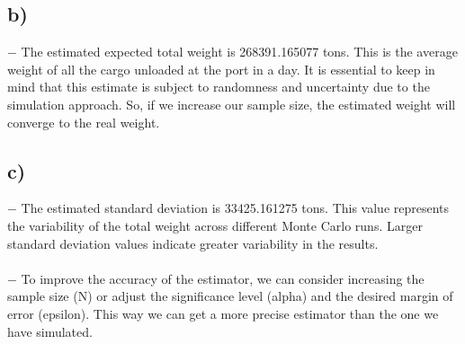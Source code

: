 \documentclass[12pt]{article}
\begin{document}
\subsection*{b)} 
$-$ The estimated expected total weight is 268391.165077 tons. This is the average weight of all the cargo unloaded at the port in a day. It is essential to keep in mind that this estimate is subject to randomness and uncertainty due to the simulation approach. So, if we increase our sample size, the estimated weight will converge to the real weight.\\
\subsection*{c)} 
$-$ The estimated standard deviation is 33425.161275 tons. This value represents  the variability of the total weight across different Monte Carlo runs. Larger standard deviation values indicate greater variability in the results.\\
\\
$-$ To improve the accuracy of the estimator, we can consider increasing the sample size (N) or adjust the significance level (alpha) and the desired margin of error (epsilon). This way we can get a more precise estimator than the one we have simulated.\\
\end{document}
